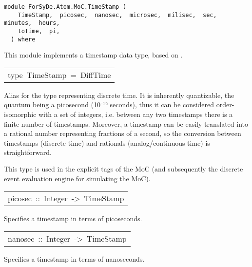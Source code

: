 \label{module:ForSyDe.Atom.MoC.TimeStamp}
\haddockbeginheader
{\haddockverb\begin{verbatim}
module ForSyDe.Atom.MoC.TimeStamp (
    TimeStamp,  picosec,  nanosec,  microsec,  milisec,  sec,  minutes,  hours, 
    toTime,  pi, 
  ) where\end{verbatim}}
\haddockendheader

This module implements a timestamp data type, based on
 . \par

\begin{haddockdesc}
\item[\begin{tabular}{@{}l}
type\ TimeStamp\ =\ DiffTime
\end{tabular}]\haddockbegindoc
Alias for the type representing discrete time. It is inherently
 quantizable, the quantum being a picosecond (10⁻¹²
 seconds), thus it can be considered order-isomorphic with a set of
 integers, i.e. between any two timestamps there is a finite number
 of timestamps. Moreover, a timestamp can be easily translated into
 a rational number representing fractions of a second, so the
 conversion between timestamps (discrete time) and rationals
 (analog/continuous time) is straightforward.\par
This type is used in the explicit tags of the
  MoC (and subsequently the discrete event
 evaluation engine for simulating the  MoC).\par

\end{haddockdesc}
\begin{haddockdesc}
\item[\begin{tabular}{@{}l}
picosec\ ::\ Integer\ ->\ TimeStamp
\end{tabular}]\haddockbegindoc
Specifies a timestamp in terms of picoseconds.\par

\end{haddockdesc}
\begin{haddockdesc}
\item[\begin{tabular}{@{}l}
nanosec\ ::\ Integer\ ->\ TimeStamp
\end{tabular}]\haddockbegindoc
Specifies a timestamp in terms of nanoseconds.\par

\end{haddockdesc}
